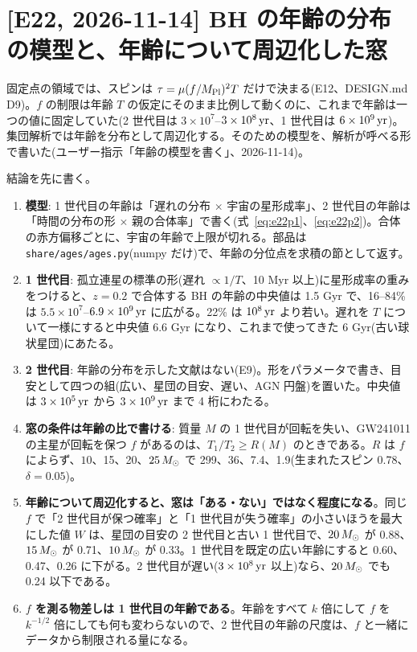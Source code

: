\section{[E22, 2026-11-14] BH の年齢の分布の模型と、年齢について周辺化した窓}\label{sec:e22}

固定点の領域では、スピンは $\tau=\mu(f/M_\mathrm{Pl})^2T$ だけで決まる(E12、DESIGN.md D9)。$f$ の制限は年齢 $T$ の仮定にそのまま比例して動くのに、これまで年齢は一つの値に固定していた(2 世代目は $3\times10^7$--$3\times10^8\,\mathrm{yr}$、1 世代目は $6\times10^9\,\mathrm{yr}$)。集団解析では年齢を分布として周辺化する。そのための模型を、解析が呼べる形で書いた(ユーザー指示「年齢の模型を書く」、2026-11-14)。

結論を先に書く。
\begin{enumerate}
\item \textbf{模型}: 1 世代目の年齢は「遅れの分布 $\times$ 宇宙の星形成率」、2 世代目の年齢は「時間の分布の形 $\times$ 親の合体率」で書く(式~\eqref{eq:e22p1}、\eqref{eq:e22p2})。合体の赤方偏移ごとに、宇宙の年齢で上限が切れる。部品は \texttt{share/ages/ages.py}(numpy だけ)で、年齢の分位点を求積の節として返す。
\item \textbf{1 世代目}: 孤立連星の標準の形(遅れ $\propto1/T$、10 Myr 以上)に星形成率の重みをつけると、$z=0.2$ で合体する BH の年齢の中央値は 1.5 Gyr で、16--84\% は $5.5\times10^7$--$6.9\times10^9\,\mathrm{yr}$ に広がる。22\% は $10^8\,\mathrm{yr}$ より若い。遅れを $T$ について一様にすると中央値 6.6 Gyr になり、これまで使ってきた 6 Gyr(古い球状星団)にあたる。
\item \textbf{2 世代目}: 年齢の分布を示した文献はない(E9)。形をパラメータで書き、目安として四つの組(広い、星団の目安、遅い、AGN 円盤)を置いた。中央値は $3\times10^5\,\mathrm{yr}$ から $3\times10^9\,\mathrm{yr}$ まで 4 桁にわたる。
\item \textbf{窓の条件は年齢の比で書ける}: 質量 $M$ の 1 世代目が回転を失い、GW241011 の主星が回転を保つ $f$ があるのは、$T_1/T_2\ge R(M)$ のときである。$R$ は $f$ によらず、$10$、15、20、$25\,M_\odot$ で 299、36、7.4、1.9(生まれたスピン 0.78、$\delta=0.05$)。
\item \textbf{年齢について周辺化すると、窓は「ある・ない」ではなく程度になる}。同じ $f$ で「2 世代目が保つ確率」と「1 世代目が失う確率」の小さいほうを最大にした値 $W$ は、星団の目安の 2 世代目と古い 1 世代目で、$20\,M_\odot$ が 0.88、$15\,M_\odot$ が 0.71、$10\,M_\odot$ が 0.33。1 世代目を既定の広い年齢にすると 0.60、0.47、0.26 に下がる。2 世代目が遅い($3\times10^8\,\mathrm{yr}$ 以上)なら、$20\,M_\odot$ でも 0.24 以下である。
\item \textbf{$f$ を測る物差しは 1 世代目の年齢である}。年齢をすべて $k$ 倍にして $f$ を $k^{-1/2}$ 倍にしても何も変わらないので、2 世代目の年齢の尺度は、$f$ と一緒にデータから制限される量になる。
\end{enumerate}

